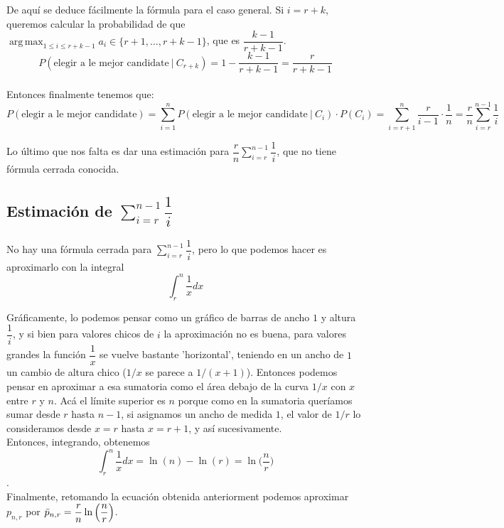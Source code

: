 \documentclass[a4paper]{article}
\DeclareMathOperator*{\argmax}{arg\,max}
\begin{document}
De aquí se deduce fácilmente la fórmula para el caso general. Si $i = r + k$, queremos calcular la probabilidad de que $\displaystyle\argmax_{1 \leq i \leq r+k-1} a_i \in \{r+1, \ldots, r+k-1\}$, que es $\dfrac{k-1}{r+k-1}$.\\

$$P(\text{elegir a le mejor candidate} \ | \ C_{r+k}) = 1 - \dfrac{k-1}{r+k-1} = \dfrac{r}{r+k-1}$$
\\

Entonces finalmente tenemos que:\\
$$P(\text{elegir a le mejor candidate}) = \sum_{i=1}^{n}P(\text{elegir a le mejor candidate} \ | \ C_i) \cdot P(C_i) = \sum_{i=r+1}^{n} \dfrac{r}{i-1} \cdot \dfrac{1}{n} = \dfrac{r}{n} \sum_{i=r}^{n-1} \dfrac{1}{i}$$

Lo último que nos falta es dar una estimación para $\dfrac{r}{n} \displaystyle\sum_{i=r}^{n-1} \dfrac{1}{i}$, que no tiene fórmula cerrada conocida.

\subsection*{Estimación de $\displaystyle\sum_{i=r}^{n-1} \dfrac{1}{i}$}
No hay una fórmula cerrada para $\displaystyle\sum_{i=r}^{n-1} \dfrac{1}{i}$, pero lo que podemos hacer es aproximarlo con la integral $$\int_{r}^{n} \dfrac{1}{x} dx$$

Gráficamente, lo podemos pensar como un gráfico de barras de ancho $1$ y altura $\dfrac{1}{i}$, y si bien para valores chicos de $i$ la aproximación no es buena, para valores grandes la función $\dfrac{1}{x}$ se vuelve bastante 'horizontal', teniendo en un ancho de $1$ un cambio de altura chico ($1/x$ se parece a $1/(x+1)$). Entonces podemos pensar en aproximar a esa sumatoria como el área debajo de la curva $1/x$ con $x$ entre $r$ y $n$. Acá el límite superior es $n$ porque como en la sumatoria queríamos sumar desde $r$ hasta $n-1$, si asignamos un ancho de medida $1$, el valor de $1/r$ lo consideramos desde $x = r$ hasta $x = r+1$, y así sucesivamente.\\

Entonces, integrando, obtenemos $$\int_{r}^{n} \dfrac{1}{x} dx = \ln(n) - \ln(r) = \ln\Big(\dfrac{n}{r}\Big)$$. \\

Finalmente, retomando la ecuación obtenida anteriorment podemos aproximar $p_{n,r}$ por $\Bar{p}_{n,r}= \dfrac{r}{n} \ln\Big(\dfrac{n}{r}\Big)$.\\
\end{document}
